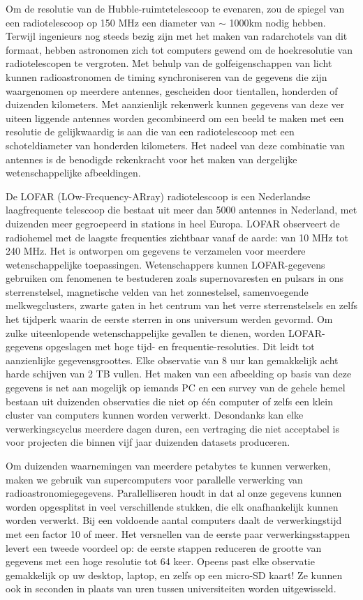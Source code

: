 Om de resolutie van de Hubble-ruimtetelescoop te evenaren, zou de spiegel van een radiotelescoop op 150 MHz een diameter van $\sim$ 1000km nodig hebben. Terwijl ingenieurs nog steeds bezig zijn met het maken van radarchotels van dit formaat, hebben astronomen zich tot computers gewend om de hoekresolutie van radiotelescopen te vergroten. Met behulp van de golfeigenschappen van licht kunnen radioastronomen de timing synchroniseren van de gegevens die zijn waargenomen op meerdere antennes, gescheiden door tientallen, honderden of duizenden kilometers. Met aanzienlijk rekenwerk kunnen gegevens van deze ver uiteen liggende antennes worden gecombineerd om een beeld te maken met een resolutie de gelijkwaardig is aan die van een radiotelescoop met een schoteldiameter van honderden kilometers. Het nadeel van deze combinatie van antennes is de benodigde rekenkracht voor het maken van dergelijke wetenschappelijke afbeeldingen.

De LOFAR (LOw-Frequency-ARray) radiotelescoop is een Nederlandse laagfrequente telescoop die bestaat uit meer dan 5000 antennes in Nederland, met duizenden meer gegroepeerd in stations in heel Europa. LOFAR observeert de radiohemel met de laagste frequenties zichtbaar vanaf de aarde: van 10 MHz tot 240 MHz. Het is ontworpen om gegevens te verzamelen voor meerdere wetenschappelijke toepassingen. Wetenschappers kunnen LOFAR-gegevens gebruiken om fenomenen te bestuderen zoals supernovaresten en pulsars in ons sterrenstelsel, magnetische velden van het zonnestelsel, samenvoegende melkwegclusters, zwarte gaten in het centrum van het verre sterrenstelsels en zelfs het tijdperk waarin de eerste sterren in ons universum werden gevormd. Om zulke uiteenlopende wetenschappelijke gevallen te dienen, worden LOFAR-gegevens opgeslagen met hoge tijd- en frequentie-resoluties. Dit leidt tot aanzienlijke gegevensgroottes. Elke observatie van 8 uur kan gemakkelijk acht harde schijven van 2 TB vullen. Het maken van een afbeelding op basis van deze gegevens is net aan mogelijk op iemands PC en een survey van de gehele hemel bestaan uit duizenden observaties die niet op één computer of zelfs een klein cluster van computers kunnen worden verwerkt. Desondanks kan elke verwerkingscyclus meerdere dagen duren, een vertraging die niet acceptabel is voor projecten die binnen vijf jaar duizenden datasets produceren.

Om duizenden waarnemingen van meerdere petabytes te kunnen verwerken, maken we gebruik van supercomputers voor parallelle verwerking van radioastronomiegegevens. Parallelliseren houdt in dat al onze gegevens kunnen worden opgesplitst in veel verschillende stukken, die elk onafhankelijk kunnen worden verwerkt. Bij een voldoende aantal computers daalt de verwerkingstijd met een factor 10 of meer. Het versnellen van de eerste paar verwerkingsstappen levert een tweede voordeel op: de eerste stappen reduceren de grootte van gegevens met een hoge resolutie tot 64 keer. Opeens past elke observatie gemakkelijk op uw desktop, laptop, en zelfs op een micro-SD kaart! Ze kunnen ook in seconden in plaats van uren tussen universiteiten worden uitgewisseld. 


